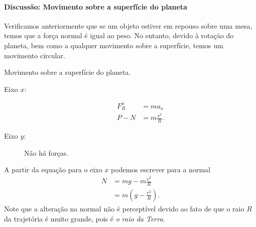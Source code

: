 \paragraph{Discussão: Movimento sobre a superfície do planeta}

Verificamos anteriormente que se um objeto estiver em repouso sobre uma mesa, temos que a força normal é igual ao peso. No entanto, devido à rotação do planeta, bem como a qualquer movimento sobre a superfície, temos um movimento circular.

\begin{marginfigure}
\centering
{}
\caption{Movimento sobre a superfície do planeta.}
\end{marginfigure}

\begin{description}
    \item[Eixo $x$:] 
        \begin{align}
            F_R^x &= m a_x \\
            P - N &= m \frac{v^2}{R}.
        \end{align}
    \item[Eixo $y$:] Não há forças.
\end{description}

\noindent{}A partir da equação para o eixo $x$ podemos escrever para a normal
\begin{align}
    N &= mg-m\frac{v^2}{R} \\
    &= m \left(g - \frac{v^2}{R}\right).
\end{align}
%
Note que a alteração na normal não é perceptível devido ao fato de que o raio $R$ da trajetória é muito grande, pois é \emph{o raio da Terra}.

